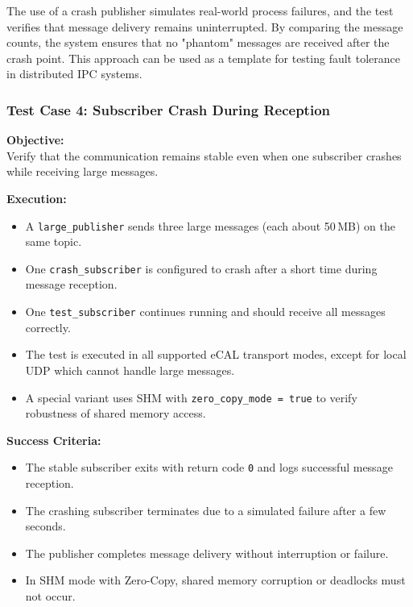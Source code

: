 \vspace{1em}

The use of a crash publisher simulates real-world process failures, and the test verifies that message delivery remains uninterrupted. By comparing the message counts, the system ensures that no "phantom" messages are received after the crash point. This approach can be used as a template for testing fault tolerance in distributed IPC systems.

\vspace{1em}
\subsubsection*{Test Case 4: Subscriber Crash During Reception}

\textbf{Objective:} \\
Verify that the communication remains stable even when one subscriber crashes while receiving large messages.

\vspace{0.5em}
\textbf{Execution:}
\begin{itemize}
	\item A \texttt{large\_publisher} sends three large messages (each about 50\,MB) on the same topic.
	\item One \texttt{crash\_subscriber} is configured to crash after a short time during message reception.
	\item One \texttt{test\_subscriber} continues running and should receive all messages correctly.
	\item The test is executed in all supported eCAL transport modes, except for local UDP which cannot handle large messages.
	\item A special variant uses SHM with \texttt{zero\_copy\_mode = true} to verify robustness of shared memory access.
\end{itemize}

\textbf{Success Criteria:}
\begin{itemize}
	\item The stable subscriber exits with return code \texttt{0} and logs successful message reception.
	\item The crashing subscriber terminates due to a simulated failure after a few seconds.
	\item The publisher completes message delivery without interruption or failure.
	\item In SHM mode with Zero-Copy, shared memory corruption or deadlocks must not occur.
\end{itemize}

